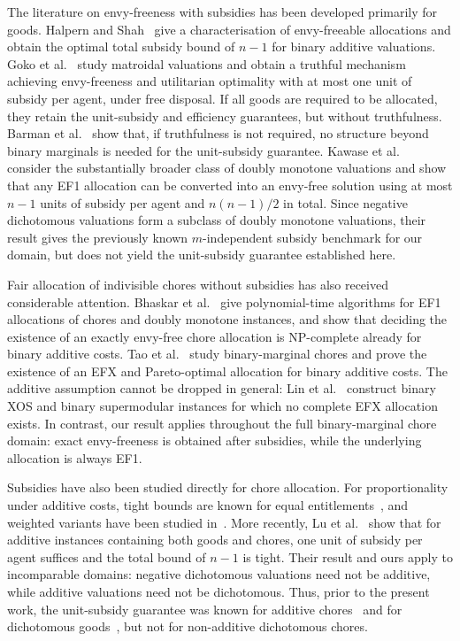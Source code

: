 \documentclass[sigconf,anonymous]{aamas}
\theoremstyle{acmplain}
\theoremstyle{acmdefinition}
\theoremstyle{acmplain}
\begin{document}
The literature on envy-freeness with subsidies has been developed primarily for goods. Halpern and Shah~\cite{HS19} give a characterisation of envy-freeable allocations and obtain the optimal total subsidy bound of $n-1$ for binary additive valuations. Goko et al.~\cite{goko2024fair} study matroidal valuations and obtain a truthful mechanism achieving envy-freeness and utilitarian optimality with at most one unit of subsidy per agent, under free disposal. If all goods are required to be allocated, they retain the unit-subsidy and efficiency guarantees, but without truthfulness. Barman et al.~\cite{BKNS22} show that, if truthfulness is not required, no structure beyond binary marginals is needed for the unit-subsidy guarantee. Kawase et al.~\cite{kawase2025towards} consider the substantially broader class of doubly monotone valuations and show that any EF1 allocation can be converted into an envy-free solution using at most $n-1$ units of subsidy per agent and $n(n-1)/2$ in total. Since negative dichotomous valuations form a subclass of doubly monotone valuations, their result gives the previously known $m$-independent subsidy benchmark for our domain, but does not yield the unit-subsidy guarantee established here.




Fair allocation of indivisible chores without subsidies has also received considerable attention. Bhaskar et al.~\cite{BSV21} give polynomial-time algorithms for EF1 allocations of chores and doubly monotone instances, and show that deciding the existence of an exactly envy-free chore allocation is NP-complete already for binary additive costs. Tao et al.~\cite{tao2025existence} study binary-marginal chores and prove the existence of an EFX and Pareto-optimal allocation for binary additive costs. The additive assumption cannot be dropped in general: Lin et al.~\cite{LLTZ26} construct binary XOS and binary supermodular instances for which no complete EFX allocation exists. In contrast, our result applies throughout the full binary-marginal chore domain: exact envy-freeness is obtained after subsidies, while the underlying allocation is always EF1.

Subsidies have also been studied directly for chore allocation. For proportionality under additive costs, tight bounds are known for equal entitlements~\cite{wu2025revisiting}, and weighted variants have been studied in~\cite{wu2024tree,GSW25}. More recently, Lu et al.~\cite{LMS26} show that for additive instances containing both goods and chores, one unit of subsidy per agent suffices and the total bound of $n-1$ is tight. Their result and ours apply to incomparable domains: negative dichotomous valuations need not be additive, while additive valuations need not be dichotomous. Thus, prior to the present work, the unit-subsidy guarantee was known for additive chores~\cite{LMS26} and for dichotomous goods~\cite{BKNS22}, but not for non-additive dichotomous chores.
\end{document}
